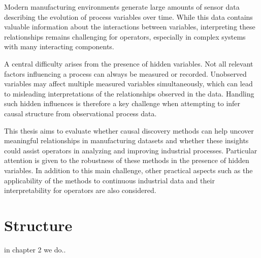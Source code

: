 Modern manufacturing environments generate large amounts of sensor data describing the evolution of process variables over time. While this data contains valuable information about the interactions between variables, interpreting these relationships remains challenging for operators, especially in complex systems with many interacting components.

A central difficulty arises from the presence of hidden variables. Not all relevant factors influencing a process can always be measured or recorded. Unobserved variables may affect multiple measured variables simultaneously, which can lead to misleading interpretations of the relationships observed in the data. Handling such hidden influences is therefore a key challenge when attempting to infer causal structure from observational process data.

This thesis aims to evaluate whether causal discovery methods can help uncover meaningful relationships in manufacturing datasets and whether these insights could assist operators in analyzing and improving industrial processes. Particular attention is given to the robustness of these methods in the presence of hidden variables. In addition to this main challenge, other practical aspects such as the applicability of the methods to continuous industrial data and their interpretability for operators are also considered.

\n

\section{Structure}

in chapter 2 we do..


